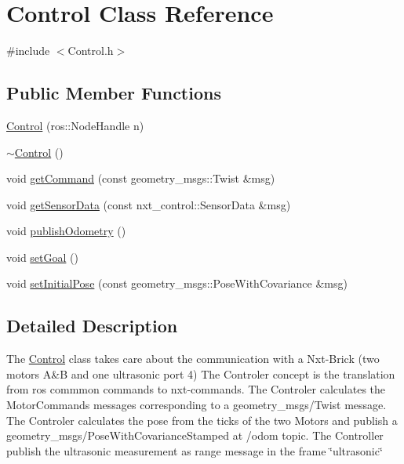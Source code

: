\hypertarget{class_control}{\section{Control Class Reference}
\label{class_control}
}


{\ttfamily \#include $<$Control.\-h$>$}

\subsection*{Public Member Functions}
\begin{DoxyCompactItemize}
\item 
\hyperlink{class_control_a497563ec0593b497d2611c1fc49e46db}{Control} (ros\-::\-Node\-Handle n)
\item 
\hyperlink{class_control_aedda1328c4f8b8d49bca8f0812d3bfd1}{$\sim$\-Control} ()
\item 
void \hyperlink{class_control_a26712b5c951b7867390ddcc6b0dd8dce}{get\-Command} (const geometry\-\_\-msgs\-::\-Twist \&msg)
\item 
void \hyperlink{class_control_a533326e0d21ff3d104495d6bd34a6300}{get\-Sensor\-Data} (const nxt\-\_\-control\-::\-Sensor\-Data \&msg)
\item 
void \hyperlink{class_control_a3fd505ef3e01cdc849aee57de324fd9b}{publish\-Odometry} ()
\item 
void \hyperlink{class_control_a4ce11d42c590f4e646f20ded70975c13}{set\-Goal} ()
\item 
void \hyperlink{class_control_a2e30ee0e4acae0c6f9266bd94fea679e}{set\-Initial\-Pose} (const geometry\-\_\-msgs\-::\-Pose\-With\-Covariance \&msg)
\end{DoxyCompactItemize}


\subsection{Detailed Description}
The \hyperlink{class_control}{Control} class takes care about the communication with a Nxt-\/\-Brick (two motors A\&B and one ultrasonic port 4) The Controler concept is the translation from ros commmon commands to nxt-\/commands. The Controler calculates the Motor\-Commands messages corresponding to a geometry\-\_\-msgs/\-Twist message. The Controler calculates the pose from the ticks of the two Motors and publish a geometry\-\_\-msgs/\-Pose\-With\-Covariance\-Stamped at /odom topic. The Controller publish the ultrasonic measurement as range message in the frame \char`\"{}ultrasonic\char`\"{} 

